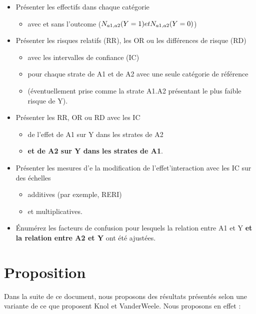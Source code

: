 \documentclass[
]{book}
\providecommand{\tightlist}{%
  \setlength{\itemsep}{0pt}\setlength{\parskip}{0pt}}
\begin{document}
\begin{itemize}
\tightlist
\item
  Présenter les effectifs dans chaque catégorie

  \begin{itemize}
  \tightlist
  \item
    avec et sans l'outcome (\(\small N_{a1,a2}(Y=1) et N_{a1,a2}(Y=0)\))
  \end{itemize}
\item
  Présenter les risques relatifs (RR), les OR ou les différences de risque (RD)

  \begin{itemize}
  \tightlist
  \item
    avec les intervalles de confiance (IC)
  \item
    pour chaque strate de A1 et de A2 avec une seule catégorie de référence
  \item
    (éventuellement prise comme la strate A1.A2 présentant le plus faible risque de Y).
  \end{itemize}
\item
  Présenter les RR, OR ou RD avec les IC

  \begin{itemize}
  \tightlist
  \item
    de l'effet de A1 sur Y dans les strates de A2
  \item
    \textbf{et de A2 sur Y dans les strates de A1}.
  \end{itemize}
\item
  Présenter les mesures d'e la modification de l'effet'interaction avec les IC sur des échelles

  \begin{itemize}
  \tightlist
  \item
    additives (par exemple, RERI)
  \item
    et multiplicatives.
  \end{itemize}
\item
  Énumérez les facteurs de confusion pour lesquels la relation entre A1 et Y \textbf{et la relation entre A2 et Y} ont été ajustées.
\end{itemize}

\hypertarget{proposition}{%
\section{Proposition}\label{proposition}}

Dans la suite de ce document, nous proposons des résultats présentés selon une variante de ce que proposent Knol et VanderWeele. Nous proposons en effet :
\end{document}
